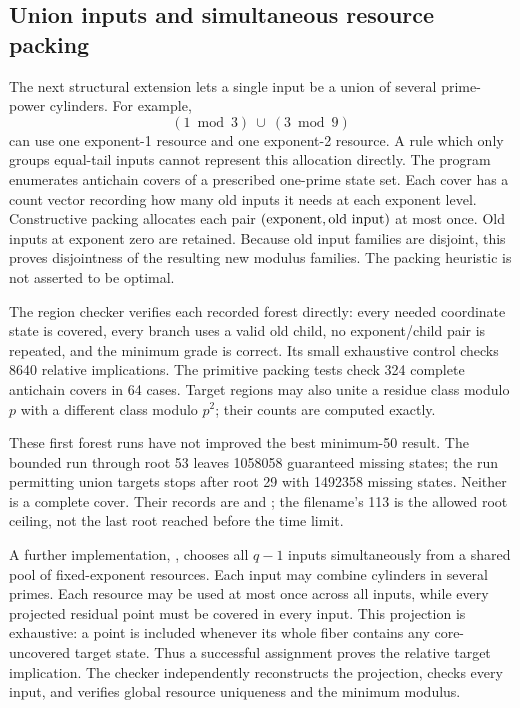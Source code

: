 \documentclass[11pt]{article}
\begin{document}
\subsection{Union inputs and simultaneous resource packing}
The next structural extension lets a single input be a union of several
prime-power cylinders. For example,
\[
  (1\bmod 3)\ \cup\ (3\bmod 9)
\]
can use one exponent-1 resource and one exponent-2 resource. A rule which
only groups equal-tail inputs cannot represent this allocation directly.
The program  enumerates antichain covers
of a prescribed one-prime state set. Each cover has a count vector recording
how many old inputs it needs at each exponent level. Constructive packing
allocates each pair $(\hbox{exponent},\hbox{old input})$ at most once.
Old inputs at exponent zero are retained. Because old input families are
disjoint, this proves disjointness of the resulting new modulus families.
The packing heuristic is not asserted to be optimal.

The region checker verifies each recorded forest directly: every needed
coordinate state is covered, every branch uses a valid old child, no
exponent/child pair is repeated, and the minimum grade is correct. Its
small exhaustive control checks 8640 relative implications. The primitive
packing tests check 324 complete antichain covers in 64 cases. Target
regions may also unite a residue class modulo $p$ with a different class
modulo $p^2$; their counts are computed exactly.

These first forest runs have not improved the best minimum-50 result.
The bounded run through root 53 leaves 1058058 guaranteed missing states;
the run permitting union targets stops after root 29 with 1492358 missing
states. Neither is a complete cover. Their records are
 and
; the filename's 113 is
the allowed root ceiling, not the last root reached before the time limit.

A further implementation, , chooses all
$q-1$ inputs simultaneously from a shared pool of fixed-exponent resources.
Each input may combine cylinders in several primes. Each resource may be
used at most once across all inputs, while every projected residual point
must be covered in every input. This projection is exhaustive: a point is
included whenever its whole fiber contains any core-uncovered target state.
Thus a successful assignment proves the relative target implication.
The checker independently reconstructs the projection, checks every input,
and verifies global resource uniqueness and the minimum modulus.
\end{document}
